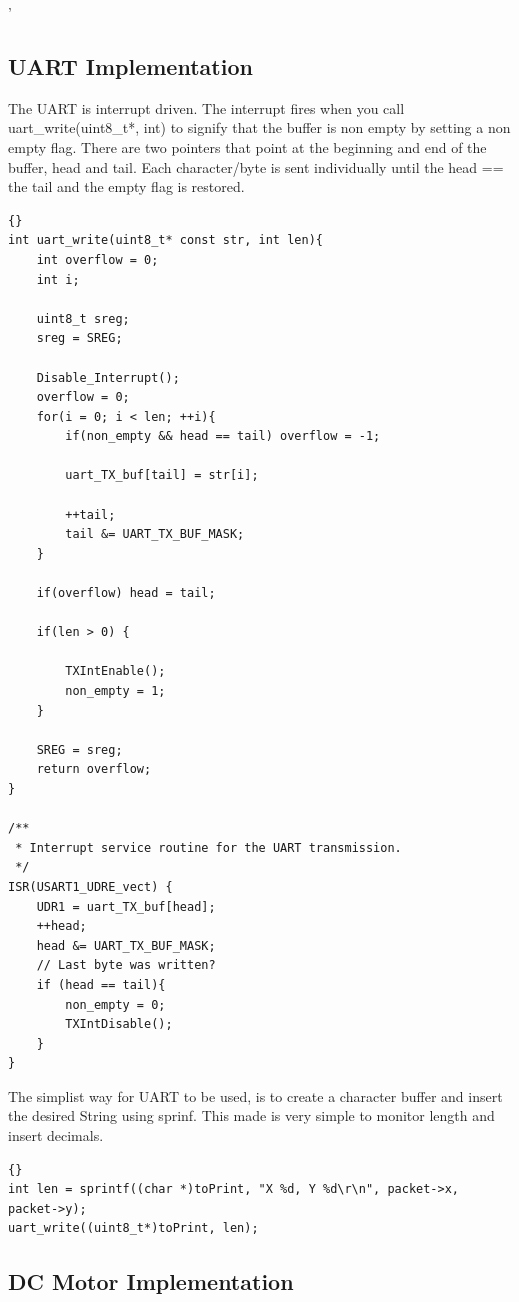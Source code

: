 '
\subsection{UART Implementation}
The UART is interrupt driven. The interrupt fires when you call uart\_write(uint8\_t*, int) to signify that the buffer is non empty by setting a non empty flag. There are two pointers that point at the beginning and end of the buffer, head and tail. Each character/byte is sent individually until the head == the tail and the empty flag is restored.

\lstset{language=c}
\lstset{commentstyle=\textit}
\begin{lstlisting}[frame=trbl]{}
int uart_write(uint8_t* const str, int len){
    int overflow = 0;
    int i;

    uint8_t sreg;
    sreg = SREG;

    Disable_Interrupt();
    overflow = 0;
    for(i = 0; i < len; ++i){  
        if(non_empty && head == tail) overflow = -1;

        uart_TX_buf[tail] = str[i];

        ++tail;
        tail &= UART_TX_BUF_MASK;
    }
    
    if(overflow) head = tail;     

    if(len > 0) {

        TXIntEnable();
        non_empty = 1;
    }

    SREG = sreg;
    return overflow; 
}

/**
 * Interrupt service routine for the UART transmission.
 */
ISR(USART1_UDRE_vect) {
    UDR1 = uart_TX_buf[head];
    ++head;
    head &= UART_TX_BUF_MASK;
    // Last byte was written?
    if (head == tail){
        non_empty = 0;
        TXIntDisable();
    }
}
\end{lstlisting}

The simplist way for UART to be used, is to create a character buffer and insert the desired String using sprinf. This made is very simple to monitor length and insert decimals. 

\lstset{language=c}
\lstset{commentstyle=\textit}
\begin{lstlisting}[frame=trbl]{}
int len = sprintf((char *)toPrint, "X %d, Y %d\r\n", packet->x, packet->y);
uart_write((uint8_t*)toPrint, len);
\end{lstlisting}

\subsection{DC Motor Implementation}

